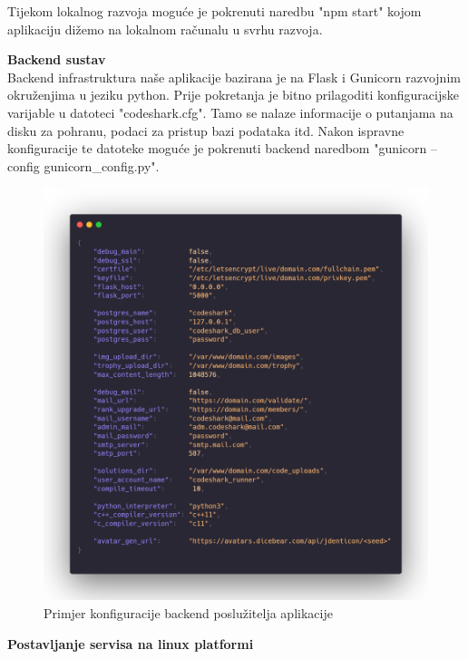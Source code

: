 			Tijekom lokalnog razvoja moguće je pokrenuti naredbu "npm start" kojom aplikaciju dižemo na lokalnom računalu u svrhu razvoja.\newline
			
			\noindent \textbf{Backend sustav}\\
			
			\noindent Backend infrastruktura naše aplikacije bazirana je na Flask i Gunicorn razvojnim okruženjima u jeziku python. Prije pokretanja je bitno prilagoditi konfiguracijske varijable u datoteci "codeshark.cfg". Tamo se nalaze informacije o putanjama na disku za pohranu, podaci za pristup bazi podataka itd. Nakon ispravne konfiguracije te datoteke moguće je pokrenuti backend naredbom "gunicorn --config gunicorn\_config.py".\newline
			
			\begin{figure}[H]
				\includegraphics[width=\textwidth]{slike/backendKonfiguracija.png} %
				\caption{Primjer konfiguracije backend poslužitelja aplikacije}
				\label{fig:DijagramRazmještaja} %
			\end{figure}
			
			
			\noindent \textbf{Postavljanje servisa na linux platformi}\\
			
